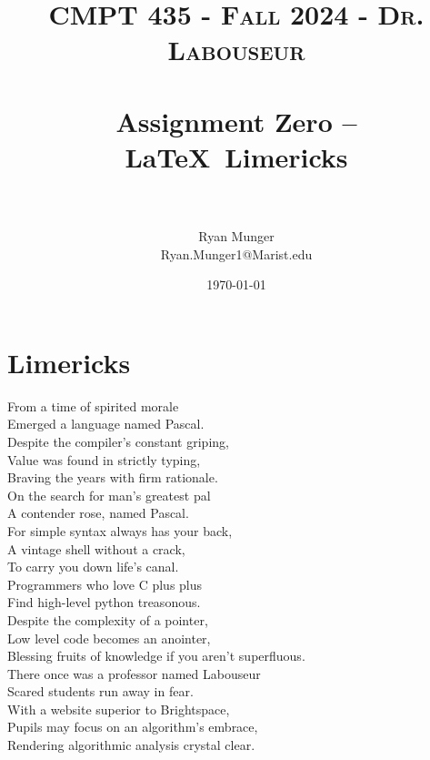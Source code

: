 \documentclass[letterpaper, 10pt]{article}
\title{	
   \normalfont \normalsize 
   \textsc{CMPT 435 - Fall 2024 - Dr. Labouseur} \\[10pt] %
   \horrule{0.5pt} \\[0.25cm] 	%
   \huge Assignment Zero -- \LaTeX ~Limericks \\     	    %
   \horrule{0.5pt} \\[0.25cm] 	%
}
\author{Ryan Munger \\ \normalsize Ryan.Munger1@Marist.edu}
\date{\normalsize\today} 	%
\begin{document}
\maketitle %



\section{Limericks}

\noindent
From a time of spirited morale \\
Emerged a language named Pascal. \\
    \hspace*{1.5em}Despite the compiler's constant griping, \\
    \hspace*{1.5em}Value was found in strictly typing, \\
Braving the years with firm rationale. \\

\noindent
On the search for man's greatest pal \\
A contender rose, named Pascal. \\
    \hspace*{1.5em}For simple syntax always has your back, \\
    \hspace*{1.5em}A vintage shell without a crack, \\
To carry you down life's canal. \\

\noindent
Programmers who love C plus plus \\
Find high-level python treasonous. \\
    \hspace*{1.5em}Despite the complexity of a pointer, \\
    \hspace*{1.5em}Low level code becomes an anointer, \\
Blessing fruits of knowledge if you aren't superfluous. \\

\noindent
There once was a professor named Labouseur \\
Scared students run away in fear. \\
    \hspace*{1.5em}With a website superior to Brightspace, \\
    \hspace*{1.5em}Pupils may focus on an algorithm's embrace, \\
Rendering algorithmic analysis crystal clear. \\
\end{document}
